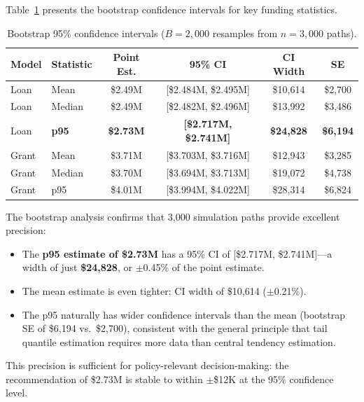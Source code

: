 \documentclass[11pt, letterpaper]{article}
\begin{document}
Table~\ref{tab:bootstrap} presents the bootstrap confidence intervals for key funding statistics.

\begin{table}[H]
  \centering
  \caption{Bootstrap 95\% confidence intervals ($B = 2{,}000$ resamples from $n = 3{,}000$ paths).}
  \label{tab:bootstrap}
  \begin{tabular}{@{}llcccc@{}}
    \toprule
    \textbf{Model} & \textbf{Statistic} & \textbf{Point Est.} & \textbf{95\% CI} & \textbf{CI Width} & \textbf{SE} \\
    \midrule
    Loan & Mean & \$2.49M & [\$2.484M, \$2.495M] & \$10{,}614 & \$2{,}700 \\
    Loan & Median & \$2.49M & [\$2.482M, \$2.496M] & \$13{,}992 & \$3{,}486 \\
    Loan & \textbf{p95} & \textbf{\$2.73M} & \textbf{[\$2.717M, \$2.741M]} & \textbf{\$24{,}828} & \textbf{\$6{,}194} \\
    \midrule
    Grant & Mean & \$3.71M & [\$3.703M, \$3.716M] & \$12{,}943 & \$3{,}285 \\
    Grant & Median & \$3.70M & [\$3.694M, \$3.713M] & \$19{,}072 & \$4{,}738 \\
    Grant & p95 & \$4.01M & [\$3.994M, \$4.022M] & \$28{,}314 & \$6{,}824 \\
    \bottomrule
  \end{tabular}
\end{table}

The bootstrap analysis confirms that 3{,}000 simulation paths provide excellent precision:

\begin{itemize}[nosep]
  \item The \textbf{p95 estimate of \$2.73M} has a 95\% CI of [\$2.717M, \$2.741M]---a width of just \textbf{\$24{,}828}, or ${\pm}$0.45\% of the point estimate.
  \item The mean estimate is even tighter: CI width of \$10{,}614 (${\pm}$0.21\%).
  \item The p95 naturally has wider confidence intervals than the mean (bootstrap SE of \$6{,}194 vs.\ \$2{,}700), consistent with the general principle that tail quantile estimation requires more data than central tendency estimation.
\end{itemize}

This precision is sufficient for policy-relevant decision-making: the recommendation of \$2.73M is stable to within ${\pm}$\$12K at the 95\% confidence level.
\end{document}
